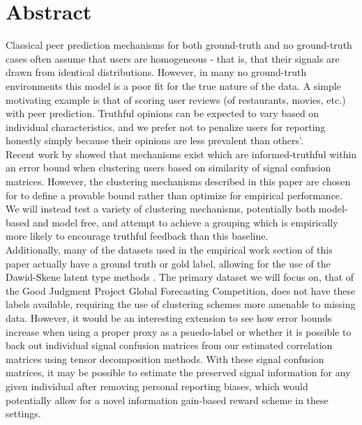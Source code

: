 \documentclass[a4paper, 12pt]{article}
\begin{document}
\maketitle


\section{Abstract}
% 
Classical peer prediction mechanisms for both ground-truth and no ground-truth cases often assume that users are homogeneous - that is, that their signals are drawn from identical distributions. However, in many no ground-truth environments this model is a poor fit for the true nature of the data. A simple motivating example is that of scoring user reviews (of restaurants, movies, etc.) with peer prediction. Truthful opinions can be expected to vary based on individual characteristics, and we prefer not to penalize users for reporting honestly simply because their opinions are less prevalent than others'. \\

Recent work by \citet{agarwal2017peer} showed that mechanisms exist which are informed-truthful within an error bound when clustering users based on similarity of signal confusion matrices. However, the clustering mechanisms described in this paper are chosen for to define a provable bound rather than optimize for empirical performance. We will instead test a variety of clustering mechanisms, potentially both model-based and model free, and attempt to achieve a grouping which is empirically more likely to encourage truthful feedback than this baseline.\\

Additionally, many of the datasets used in the empirical work section of this paper actually have a ground truth or gold label, allowing for the use of the Dawid-Skene latent type methods \citep{dawid1979maximum}. The primary dataset we will focus on, that of the Good Judgment Project Global Forecasting Competition, does not have these labels available, requiring the use of clustering schemes more amenable to missing data. However, it would be an interesting extension to see how error bounds increase when using a proper proxy \citep{witkowski2017proper} as a psuedo-label or whether it is possible to back out individual signal confusion matrices from our estimated correlation matrices using tensor decomposition methods. With these signal confusion matrices, it may be possible to estimate the preserved signal information for any given individual after removing personal  reporting biases, which would potentially allow for a novel information gain-based reward scheme in these settings.
\end{document}
